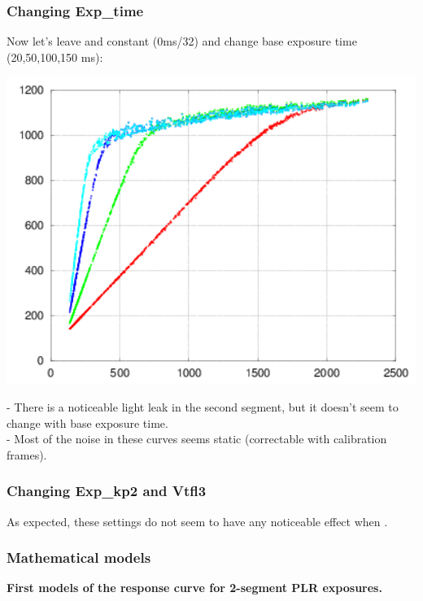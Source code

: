 \subsubsection{Changing Exp\_time}

Now let's leave  and  constant (0ms/32) and change base exposure time (20,50,100,150 ms):\\

\begin{center}
\includegraphics[height=10cm]{images/x-0-32-plr-vs-30ms-lin}
\end{center}

- There is a noticeable light leak in the second segment, but it doesn't seem to change with base exposure time.\\
- Most of the noise in these curves seems static (correctable with calibration frames). \\

\subsubsection{Changing Exp\_kp2 and Vtfl3}

As expected, these settings do not seem to have any noticeable effect when . 


\subsubsection{Mathematical models}

\textbf{First models of the response curve for 2-segment PLR exposures.}

